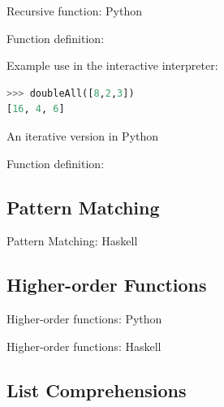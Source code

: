 \documentclass{beamer}
\begin{document}
\begin{frame}[fragile]{Recursive function: Python}

Function definition:
  

Example use in the interactive interpreter:
  \begin{lstlisting}[language=Python]
>>> doubleAll([8,2,3])
[16, 4, 6]
  \end{lstlisting}

\end{frame}

\begin{frame}{An iterative version in Python}

Function definition:
  
\end{frame}

\subsection{Pattern Matching}

\begin{frame}{Pattern Matching: Haskell}

  

\end{frame}

\subsection{Higher-order Functions}

\begin{frame}{Higher-order functions: Python}

  

\end{frame}

\begin{frame}{Higher-order functions: Haskell}

  

\end{frame}


\subsection{List Comprehensions}
\end{document}
